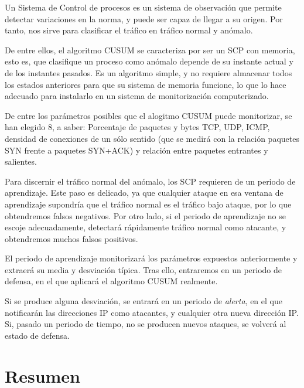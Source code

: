 Un Sistema de Control de procesos es un sistema de observación que permite detectar variaciones en la norma, y puede 
ser capaz de llegar a su origen. Por tanto, nos sirve para clasificar el tráfico en tráfico normal y anómalo.

De entre ellos, el algoritmo \gls{CUSUM} se caracteriza por ser un \gls{SCP} con memoria, esto es, que clasifique un 
proceso como anómalo depende de su instante actual y de los instantes pasados. Es un algoritmo simple, y no requiere 
almacenar todos los estados anteriores para que su sistema de memoria funcione, lo que lo hace adecuado para instalarlo 
en un sistema de monitorización computerizado.

De entre los parámetros posibles que el alogitmo \gls{CUSUM} puede monitorizar, se han elegido $8$, a saber: Porcentaje 
de paquetes y bytes \gls{TCP}, \gls{UDP}, \gls{ICMP}, densidad de conexiones de un sólo sentido (que se medirá con 
la relación paquetes \gls{SYN} frente a paquetes \gls{SYN}+\gls{ACK}) y relación entre paquetes entrantes y salientes.

Para discernir el tráfico normal del anómalo, los \gls{SCP} requieren de un periodo de aprendizaje. Este paso es 
delicado, ya que cualquier ataque en esa ventana de aprendizaje supondría que el tráfico normal es el tráfico 
bajo ataque, por lo que obtendremos falsos negativos. Por otro lado, si el periodo de aprendizaje no se escoje 
adecuadamente, detectará rápidamente tráfico normal como atacante, y obtendremos muchos falsos positivos.

El periodo de aprendizaje monitorizará los parámetros expuestos anteriormente y extraerá su media y desviación típica. 
Tras ello, entraremos en un periodo de defensa, en el que aplicará el algoritmo \gls{CUSUM} realmente. 

Si se produce alguna desviación, se entrará en un periodo de \emph{alerta}, en el que notificarán las direcciones 
\gls{IP} como atacantes, y cualquier otra nueva dirección \gls{IP}. Si, pasado un periodo de tiempo, no se producen 
nuevos ataques, se volverá al estado de defensa.

\section{Resumen}%

